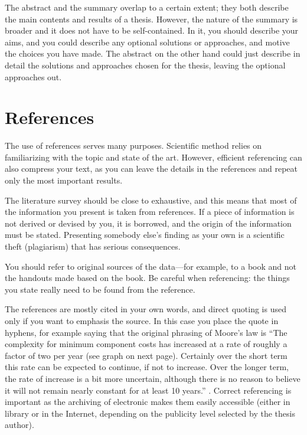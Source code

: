 The abstract and the summary overlap to a certain extent; they both describe the main contents and results of a thesis. However, the nature of the summary is broader and it does not have to be self-contained. In it, you should describe your aims, and you could describe any optional solutions or approaches, and motive the choices you have made. The abstract on the other hand could just describe in detail the solutions and approaches chosen for the thesis, leaving the optional approaches out.

\section{References}

The use of references serves many purposes. Scientific method relies on familiarizing with the topic and state of the art. However, efficient referencing can also compress your text, as you can leave the details in the references and repeat only the most important results.

The literature survey should be close to exhaustive, and this means that most of the information you present is taken from references. If a piece of information is not derived or devised by you, it is borrowed, and the origin of the information must be stated. Presenting somebody else’s finding as your own is a scientific theft (plagiarism) that has serious consequences.

You should refer to original sources of the data---for example, to a book and not the handouts made based on the book. Be careful when referencing: the things you state really need to be found from the reference.

The references are mostly cited in your own words, and direct quoting is used only if you want to emphasis the source. In this case you place the quote in hyphens, for example saying that the original phrasing of Moore’s law is  “The complexity for minimum component costs has increased at a rate of roughly a factor of two per year (see graph on next page). Certainly over the short term this rate can be expected to continue, if not to increase. Over the longer term, the rate of increase is a bit more uncertain, although there is no reason to believe it will not remain nearly constant for at least 10 years.” \cite{moore}.  Correct referencing is  important as the archiving of electronic makes them easily accessible (either in library or in the Internet, depending on the publicity level selected by the thesis author).

